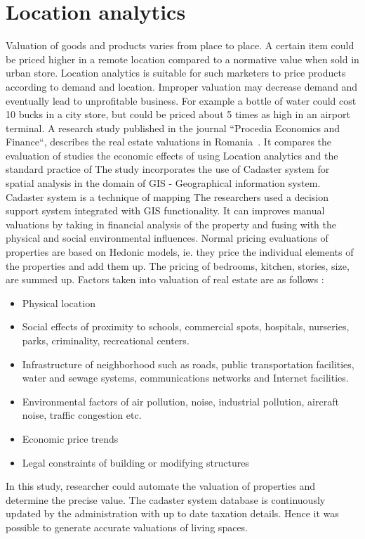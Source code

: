 \section{Location analytics}
Valuation of goods and products varies from place to place. A certain item could be priced higher in a remote location compared to a normative value when sold in urban store.
Location analytics is suitable for such marketers to price products according to demand and location. Improper valuation may decrease demand and eventually lead to unprofitable business. For example a bottle of water could cost 10 bucks in a city store, but could be priced about 5 times as high in an airport terminal. 
A research study published in the journal ``Procedia Economics and Finance``, describes the real estate valuations in Romania~. It compares the evaluation of  studies the economic effects of using Location analytics and the standard practice of 
The study incorporates the use of Cadaster system for spatial analysis in the domain of GIS - Geographical information system. Cadaster system is a technique of mapping 
The researchers used a decision support system integrated with GIS functionality. It can improves manual valuations by taking in financial analysis of the property and fusing with the physical and social environmental influences.
Normal pricing evaluations of properties are based on Hedonic models, ie. they price the individual elements of the properties and add them up. The pricing of bedrooms, kitchen, stories, size, are summed up.
Factors taken into valuation of real estate are as follows :
\begin{itemize}
	\item Physical location 
	\item Social effects of proximity to schools, commercial spots, hospitals, nurseries, parks, criminality, recreational centers.
	\item Infrastructure of neighborhood such as roads, public transportation facilities, water and sewage systems, communications networks and Internet facilities.
	\item Environmental factors of air pollution, noise, industrial pollution, aircraft noise, traffic congestion etc.
	\item Economic price trends
	\item Legal constraints of building or modifying structures
\end{itemize}
In this study, researcher could automate the valuation of properties and determine the precise value. The cadaster system database is continuously updated by the administration with up to date taxation details. Hence it was possible to generate accurate valuations of living spaces.

